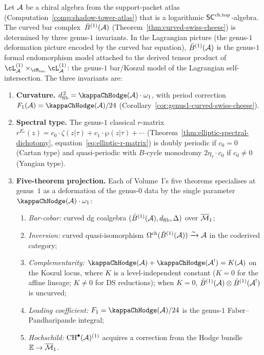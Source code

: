 \begin{theorem}%
\label{thm:genus1-endomorphism-atlas}%
%
Let\/ $\mathcal{A}$ be a chiral algebra from the support-packet atlas
\textup{(}Computation~\textup{\ref{comp:shadow-tower-atlas}}\textup{)}
that is a logarithmic\/ $\mathsf{SC}^{\mathrm{ch,top}}$-algebra.
The curved bar complex~$\bar{B}^{(1)}(\mathcal{A})$
\textup{(}Theorem~\textup{\ref{thm:curved-swiss-cheese}}\textup{)}
is determined by three genus-$1$ invariants.
In the Lagrangian picture
\textup{(}the genus-$1$ deformation picture encoded by the curved bar
equation\textup{)},
$\bar{B}^{(1)}(\mathcal{A})$ is the genus-$1$ formal endomorphism model
attached to the derived tensor product of
$\cL_\cA^{(1)} \times_{\Mvac}
\cL_\cA^{(1)}$:
the genus-$1$ bar/Koszul model of the Lagrangian
self-intersection. The three invariants are:
\begin{enumerate}[label=\textup{(\roman*)}]
\item \textbf{Curvature.}
 $\dfib^{\,2} = \kappaChHodge(\cA) \cdot \omega_1$, with period
 correction
 $F_1(\cA) = \kappaChHodge(\cA)/24$
 \textup{(}Corollary~\textup{\ref{cor:genus1-curved-swiss-cheese}}\textup{)}.

\item \textbf{Spectral type.}
 The genus-$1$ classical $r$-matrix
 $r^{E_\tau}(z) = c_0 \cdot \zeta(z|\tau) + c_1 \cdot \wp(z|\tau)
 + \cdots$
 \textup{(}Theorem~\textup{\ref{thm:elliptic-spectral-dichotomy}},
 equation~\eqref{eq:elliptic-r-matrix}\textup{)}
 is doubly periodic if\/ $c_0 = 0$ \textup{(}Cartan type\textup{)}
 and quasi-periodic with $B$-cycle monodromy
 $2\eta_\tau \cdot c_0$ if\/ $c_0 \ne 0$
 \textup{(}Yangian type\textup{)}.

\item \textbf{Five-theorem projection.}
 Each of Volume~I's five theorems specialises at genus~$1$
 as a deformation of the genus-$0$ data by the single
 parameter $\kappaChHodge(\cA) \cdot \omega_1$:
 \begin{enumerate}[label=\textup{(\Alph*$_1$)},leftmargin=2.5em]
 \item \emph{Bar-cobar:} curved dg coalgebra
 $(\bar{B}^{(1)}(\mathcal{A}), d_{\mathrm{fib}}, \Delta)$ over $\overline{\mathcal{M}}_1$;
 \item \emph{Inversion:} curved quasi-isomorphism
 $\Omega^{\mathrm{ch}}(\bar{B}^{(1)}(\mathcal{A})) \xrightarrow{\sim} \mathcal{A}$
 in the coderived category;
 \item \emph{Complementarity:}
 $\kappaChHodge(\cA) + \kappaChHodge(\cA^!) = K(\cA)$ on the Koszul locus,
 where $K$ is a level-independent constant ($K = 0$ for the
 affine lineage; $K \neq 0$ for DS reductions);
 when $K = 0$, $\bar{B}^{(1)}(\mathcal{A}) \otimes \bar{B}^{(1)}(\mathcal{A}^!)$
 is uncurved;
 \item \emph{Leading coefficient:}
 $F_1 = \kappaChHodge(\cA)/24$ is the genus-$1$
 Faber--Pandharipande integral;
 \item \emph{Hochschild:}
 $\mathrm{CH}^\bullet(\mathcal{A})^{(1)}$ acquires a correction
 from the Hodge bundle
 $\mathbb{E} \to \overline{\mathcal{M}}_1$.
 \end{enumerate}
\end{enumerate}


\end{theorem}
